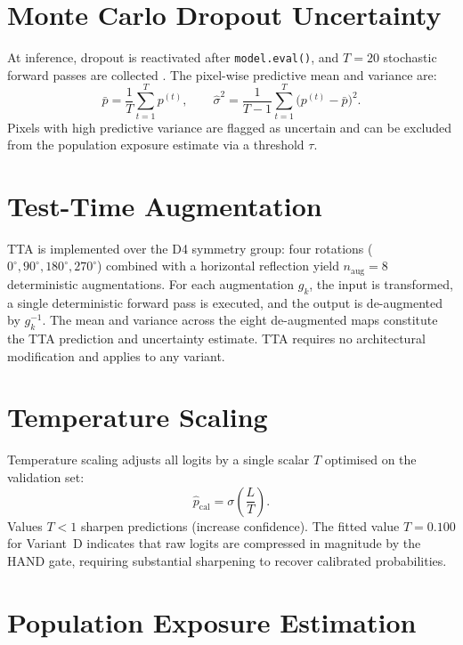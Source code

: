 \documentclass[12pt,oneside]{report}
\begin{document}
\section{Monte Carlo Dropout Uncertainty}

At inference, dropout is reactivated after \texttt{model.eval()}, and $T = 20$
stochastic forward passes are collected \cite{gal2016dropout}.
The pixel-wise predictive mean and variance are:
\begin{equation}
  \bar{p} = \frac{1}{T}\sum_{t=1}^{T} p^{(t)}, \qquad
  \hat{\sigma}^2 = \frac{1}{T-1}\sum_{t=1}^{T}\bigl(p^{(t)} - \bar{p}\bigr)^2.
  \label{eq:mc_stats}
\end{equation}
Pixels with high predictive variance are flagged as uncertain and can be
excluded from the population exposure estimate via a threshold $\tau$.

\section{Test-Time Augmentation}

TTA is implemented over the D4 symmetry group: four rotations
($0^\circ, 90^\circ, 180^\circ, 270^\circ$) combined with a horizontal
reflection yield $n_\text{aug} = 8$ deterministic augmentations.
For each augmentation $g_k$, the input is transformed, a single deterministic
forward pass is executed, and the output is de-augmented by $g_k^{-1}$.
The mean and variance across the eight de-augmented maps constitute the TTA
prediction and uncertainty estimate.
TTA requires no architectural modification and applies to any variant.

\section{Temperature Scaling}

Temperature scaling \cite{guo2017calibration} adjusts all logits by a single
scalar $T$ optimised on the validation set:
\begin{equation}
  \hat{p}_\text{cal} = \sigma\!\left(\frac{L}{T}\right).
  \label{eq:temp_scale}
\end{equation}
Values $T < 1$ sharpen predictions (increase confidence).
The fitted value $T = 0.100$ for Variant~D indicates that raw logits are
compressed in magnitude by the HAND gate, requiring substantial sharpening to
recover calibrated probabilities.

\section{Population Exposure Estimation}
\end{document}

